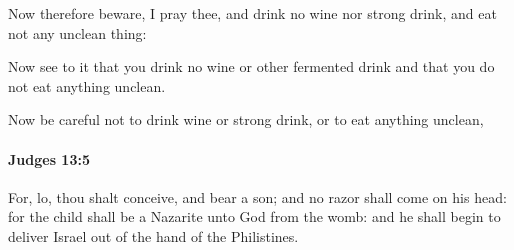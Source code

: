 			\begin{versebox}
					\item[BHS] 
					\item[ASV] Now therefore beware, I pray thee, and drink no wine nor strong drink, and eat not any unclean thing:
					\item[NIV] Now see to it that you drink no wine or other fermented drink and that you do not eat anything unclean.
					\item[NRSV] Now be careful not to drink wine or strong drink, or to eat anything unclean,
			\end{versebox}

		\paragraph{Judges 13:5} %
			\label{JUDGES-13-5}

			For, lo, thou shalt conceive, and bear a son; and no razor shall come on his head: for the child shall be a Nazarite unto God from the womb: and he shall begin to deliver Israel out of the hand of the Philistines.

